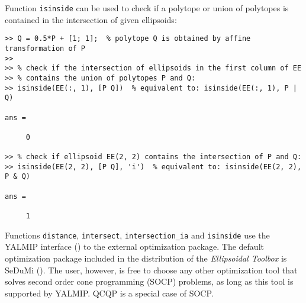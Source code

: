 Function {\tt isinside} can be used to check if a polytope or union of
polytopes is contained in the intersection of given ellipsoids:
{\tt \begin{verbatim}
>> Q = 0.5*P + [1; 1];  % polytope Q is obtained by affine transformation of P
>>
>> % check if the intersection of ellipsoids in the first column of EE
>> % contains the union of polytopes P and Q:
>> isinside(EE(:, 1), [P Q])  % equivalent to: isinside(EE(:, 1), P | Q)

ans =

     0

>> % check if ellipsoid EE(2, 2) contains the intersection of P and Q:
>> isinside(EE(2, 2), [P Q], 'i')  % equivalent to: isinside(EE(2, 2), P & Q)

ans =

     1
\end{verbatim} }
Functions {\tt distance}, {\tt intersect}, {\tt intersection\_ia} and
{\tt isinside} use the YALMIP interface (\cite{yalmip, yalmiphp}) to the
external optimization package. The default optimization package included
in the distribution of the {\it Ellipsoidal Toolbox} is SeDuMi
(\cite{sedumi, sedumihp}). The user, however, is free to choose
any other optimization tool that solves second order cone programming (SOCP)
problems, as long as this tool is supported by YALMIP. QCQP is a special case
of SOCP.



